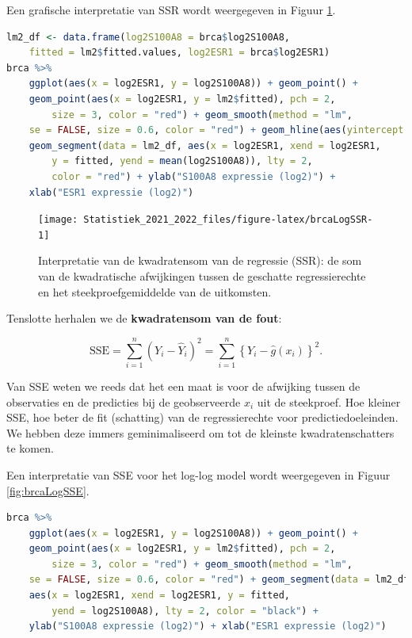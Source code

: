 \documentclass[
  12pt,dutch,coursenotes]{book}
\theoremstyle{definition}
\theoremstyle{definition}
\theoremstyle{definition}
\theoremstyle{definition}
\theoremstyle{remark}
\begin{document}
Een grafische interpretatie van SSR wordt weergegeven in Figuur \ref{fig:brcaLogSSR}.

\begin{lstlisting}[language=R]
lm2_df <- data.frame(log2S100A8 = brca$log2S100A8,
    fitted = lm2$fitted.values, log2ESR1 = brca$log2ESR1)
brca %>%
    ggplot(aes(x = log2ESR1, y = log2S100A8)) + geom_point() +
    geom_point(aes(x = log2ESR1, y = lm2$fitted), pch = 2,
        size = 3, color = "red") + geom_smooth(method = "lm",
    se = FALSE, size = 0.6, color = "red") + geom_hline(aes(yintercept = mean(log2S100A8))) +
    geom_segment(data = lm2_df, aes(x = log2ESR1, xend = log2ESR1,
        y = fitted, yend = mean(log2S100A8)), lty = 2,
        color = "red") + ylab("S100A8 expressie (log2)") +
    xlab("ESR1 expressie (log2)")
\end{lstlisting}

\begin{figure}

{\centering \texttt{[image: Statistiek\_2021\_2022\_files/figure-latex/brcaLogSSR-1]} 

}

\caption{Interpretatie van de kwadratensom van de regressie (SSR): de som van de kwadratische afwijkingen tussen de geschatte regressierechte en het steekproefgemiddelde van de uitkomsten.}\label{fig:brcaLogSSR}
\end{figure}

Tenslotte herhalen we de \textbf{kwadratensom van de fout}:

\[ \text{SSE} = \sum_{i=1}^n (Y_i-\hat{Y}_i )^2 = \sum_{i=1}^n \left\{Y_i-\hat{g}\left(x_i\right)\right\}^2.\]

Van SSE weten we reeds dat het een maat is voor de afwijking tussen de observaties en de predicties bij de geobserveerde \(x_i\) uit de steekproef.
Hoe kleiner SSE, hoe beter de fit (schatting) van de regressierechte voor predictiedoeleinden. We hebben deze immers geminimaliseerd om tot de kleinste kwadratenschatters te komen.

Een interpretatie van SSE voor het log-log model wordt weergegeven in Figuur \ref{fig:brcaLogSSE}.

\begin{lstlisting}[language=R]
brca %>%
    ggplot(aes(x = log2ESR1, y = log2S100A8)) + geom_point() +
    geom_point(aes(x = log2ESR1, y = lm2$fitted), pch = 2,
        size = 3, color = "red") + geom_smooth(method = "lm",
    se = FALSE, size = 0.6, color = "red") + geom_segment(data = lm2_df,
    aes(x = log2ESR1, xend = log2ESR1, y = fitted,
        yend = log2S100A8), lty = 2, color = "black") +
    ylab("S100A8 expressie (log2)") + xlab("ESR1 expressie (log2)")
\end{lstlisting}
\end{document}
